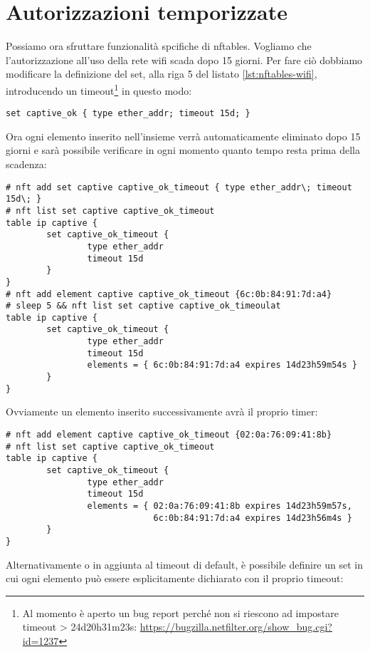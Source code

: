 \section{Autorizzazioni temporizzate}

Possiamo ora sfruttare funzionalità spcifiche di nftables.  Vogliamo che
l'autorizzazione all'uso della rete wifi scada dopo 15 giorni.  Per fare ciò
dobbiamo modificare la definizione del set, alla riga 5 del listato
\ref{lst:nftables-wifi}, introducendo un timeout\footnote{Al momento \`e aperto
un bug report perch\'e non si riescono ad impostare timeout > 24d20h31m23s:
\url{https://bugzilla.netfilter.org/show\_bug.cgi?id=1237}} in questo modo:
\begin{lstlisting}[style=customc, firstnumber=5]
set captive_ok { type ether_addr; timeout 15d; }
\end{lstlisting}
Ora ogni elemento inserito nell'insieme verrà automaticamente eliminato dopo 15
giorni e sarà possibile verificare in ogni momento quanto tempo resta prima
della scadenza:
\begin{lstlisting}[style=customc]
# nft add set captive captive_ok_timeout { type ether_addr\; timeout 15d\; }
# nft list set captive captive_ok_timeout
table ip captive {
        set captive_ok_timeout {
                type ether_addr
                timeout 15d
        }
}
# nft add element captive captive_ok_timeout {6c:0b:84:91:7d:a4}
# sleep 5 && nft list set captive captive_ok_timeoulat
table ip captive {
        set captive_ok_timeout {
                type ether_addr
                timeout 15d
                elements = { 6c:0b:84:91:7d:a4 expires 14d23h59m54s }
        }
}
\end{lstlisting}
Ovviamente un elemento inserito successivamente avrà il proprio timer:
\begin{lstlisting}[style=customc]
# nft add element captive captive_ok_timeout {02:0a:76:09:41:8b}
# nft list set captive captive_ok_timeout
table ip captive {
        set captive_ok_timeout {
                type ether_addr
                timeout 15d
                elements = { 02:0a:76:09:41:8b expires 14d23h59m57s,
                             6c:0b:84:91:7d:a4 expires 14d23h56m4s }
        }
}
\end{lstlisting}
Alternativamente o in aggiunta al timeout di default, è possibile definire un
set in cui ogni elemento può essere esplicitamente dichiarato con il proprio
timeout:

